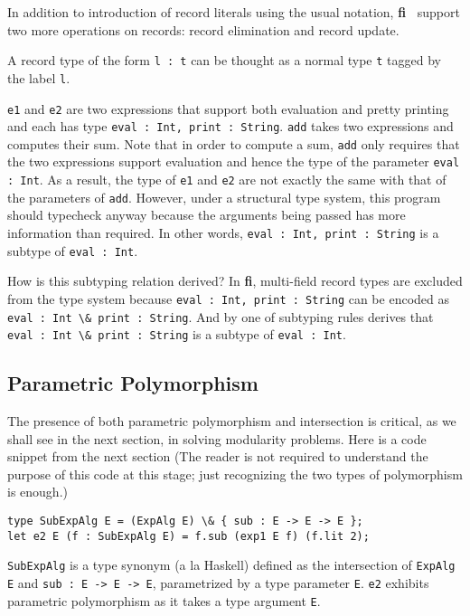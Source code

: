 \documentclass[preprint]{sigplanconf}
\newcommand{\systemF}{{\bf f}}
\newcommand{\systemfi}{{\bf fi~}}
\newcommand{\systemFI}{{\bf fi}}
\begin{document}
In addition to introduction of record literals using the usual notation, \systemfi
support two more operations on records: record elimination and record update.

A record type of the form \lstinline{l : t} can be thought as a normal type \lstinline{t}
tagged by the label \lstinline{l}.



\lstinline{e1} and \lstinline{e2} are two expressions that support both evaluation and pretty
printing and each has type \lstinline{eval : Int, print : String}. \lstinline{add} takes
two expressions and computes their sum. Note that in order to compute a sum,
\lstinline{add} only requires that the two expressions support evaluation and hence the
type of the parameter \lstinline{eval : Int}. As a result, the type of \lstinline{e1} and
\lstinline{e2} are not exactly the same with that of the parameters of \lstinline{add}. However,
under a structural type system, this program should typecheck anyway because the
arguments being passed has more information than required. In other words,
\lstinline{eval : Int, print : String} is a subtype of \lstinline{eval : Int}.

How is this subtyping relation derived? In \systemFI, multi-field record types are
excluded from the type system because \lstinline{eval : Int, print : String} can
be encoded as \lstinline{eval : Int \& print : String}. And by one of
subtyping rules derives that \lstinline{eval : Int \& print : String} is a
subtype of \lstinline{eval : Int}.



\subsection{Parametric Polymorphism}

The presence of both parametric polymorphism and intersection is critical, as we
shall see in the next section, in solving modularity problems. Here is a code
snippet from the next section (The reader is not required to understand the
purpose of this code at this stage; just recognizing the two types of
polymorphism is enough.)
\begin{lstlisting}
type SubExpAlg E = (ExpAlg E) \& { sub : E -> E -> E };
let e2 E (f : SubExpAlg E) = f.sub (exp1 E f) (f.lit 2);
\end{lstlisting}
\lstinline{SubExpAlg} is a type synonym (a la Haskell) defined as the intersection of
\lstinline{ExpAlg E} and \lstinline{sub : E -> E -> E}, parametrized by a type parameter
\lstinline{E}. \lstinline{e2} exhibits parametric polymorphism as it takes a type argument
\lstinline{E}.
\end{document}
